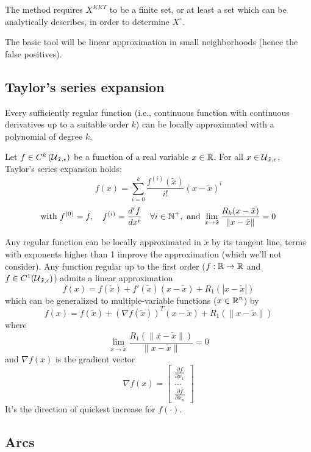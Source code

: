 The method requires $X^{KKT}$ to be a finite set, or at least a set which can be analytically describes, in order to determine $X^\circ$.

The basic tool will be linear approximation in small neighborhoods (hence the false positives).

\subsection{Taylor's series expansion}
\label{subsec:taylor}

Every sufficiently regular function (i.e., continuous function with continuous derivatives up to a suitable order $k$) can be locally approximated with a polynomial of degree $k$. \\

\begin{theo}
	Let $f \in C^k \left(\operatorname{\mathcal{U}}_{\tilde x, \epsilon}\right)$ be a function of a real variable $x \in \operatorname{\mathbb{R}}$. For all $x \in \operatorname{\mathcal{U}}_{\tilde x, \epsilon}$, Taylor's series expansion holds: 
	$$ f(x) = \sum_{i = 0}^k \frac{f^{(i)} (\tilde x)}{i!} (x - \tilde x)^i $$ 
	$$ \text{with } f^{(0)}  = f, \quad f^{(i)} = \frac{d^i f}{dx^i} \quad \forall i \in \operatorname{\mathbb{N}}^+, \text{ and } \lim_{x \rightarrow \tilde x} \frac{R_k (x - \tilde x)}{\|x - \tilde x\|} = 0$$
\end{theo}

Any regular function can be locally approximated in $\tilde x$ by its tangent line, terms with exponents higher than 1 improve the approximation (which we'll not consider). Any function regular up to the first order ($f: \operatorname{\mathbb{R}} \rightarrow \operatorname{\mathbb{R}}$ and $f \in C^1 (\operatorname{\mathcal{U}}_{\tilde x, \epsilon})$) admits a linear approximation
$$ f(x) = f(\tilde x) +  f'(\tilde x) (x - \tilde x)  + R_1 (|x - \tilde x|)$$
which can be generalized to multiple-variable functions ($x \in \operatorname{\mathbb{R}}^n$) by 
$$ f(x) = f(\tilde x) + \left(\nabla f(\tilde x)\right)^T (x  - \tilde x) + R_1 (\|x - \tilde x\|) $$
where 
$$ \lim_{x \rightarrow \tilde x} \frac{R_1 \left(\|x - \tilde x\|\right)}{\|x - \tilde x\|} = 0$$
and $\nabla f(x)$ is the gradient vector
$$ 
\nabla f(x) = \left[\begin{array}{c}
	\frac{\partial f}{\partial x_1} \\ \dots \\ \frac{\partial f}{\partial x_n}
\end{array}\right]
$$
It's the direction of quickest increase for $f(\cdot)$.

\subsection{Arcs}
\label{subsec:arcs}

